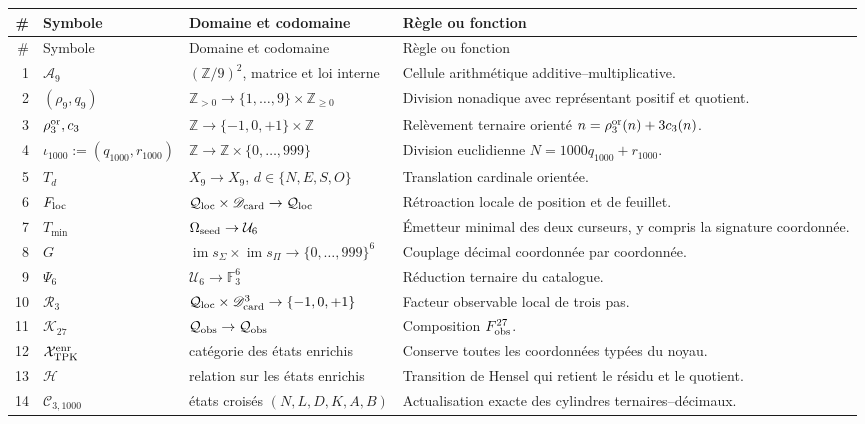 {\begingroup
\scriptsize
\renewcommand{\arraystretch}{1.12}
\begin{longtable}{@{}r p{}p{}p{}@{}}
\toprule
\#&Symbole&Domaine et codomaine&Règle ou fonction\\
\midrule
\endfirsthead
\toprule
\#&Symbole&Domaine et codomaine&Règle ou fonction\\
\midrule
\endhead
1&\(\mathcal A_9\)&\((\mathbb Z/9)^2\), matrice et loi interne&
Cellule arithmétique additive--multiplicative.\\
2&\((\rho_9,q_9)\)&\(\mathbb Z_{>0}\to
\{1,\ldots,9\}\times\mathbb Z_{\geq0}\)&
Division nonadique avec représentant positif et quotient.\\
3&\(\rho_3^{\rm or},c_3\)&\(\mathbb Z\to
\{-1,0,+1\}\times\mathbb Z\)&
Relèvement ternaire orienté \(n=\rho_3^{\rm or}(n)+3c_3(n)\).\\
4&\(\iota_{1000}:=(q_{1000},r_{1000})\)&\(\mathbb Z\to
\mathbb Z\times\{0,\ldots,999\}\)&
Division euclidienne \(N=1000q_{1000}+r_{1000}\).\\
5&\(T_d\)&\(X_9\to X_9\), \(d\in\{N,E,S,O\}\)&
Translation cardinale orientée.\\
6&\(F_{\rm loc}\)&\(\mathcal Q_{\rm loc}\times
\mathscr D_{\rm card}\to\mathcal Q_{\rm loc}\)&
Rétroaction locale de position et de feuillet.\\
7&\(T_{\min}\)&\(\Omega_{\rm seed}\to\mathcal U_6\)&
Émetteur minimal des deux curseurs, y compris la signature coordonnée.\\
8&\(G\)&\(\operatorname{im}s_\Sigma\times
\operatorname{im}s_\Pi\to\{0,\ldots,999\}^6\)&
Couplage décimal coordonnée par coordonnée.\\
9&\(\Psi_6\)&\(\mathcal U_6\to\mathbb F_3^6\)&
Réduction ternaire du catalogue.\\
10&\(\mathcal R_3\)&\(\mathcal Q_{\rm loc}\times
\mathscr D_{\rm card}^3\to\{-1,0,+1\}\)&
Facteur observable local de trois pas.\\
11&\(\mathcal K_{27}\)&\(\mathcal Q_{\rm obs}\to\mathcal Q_{\rm obs}\)&
Composition \(F_{\rm obs}^{27}\).\\
12&\(\mathcal X_{\rm TPK}^{\rm enr}\)&catégorie des états enrichis&
Conserve toutes les coordonnées typées du noyau.\\
13&\(\mathcal H\)&relation sur les états enrichis&
Transition de Hensel qui retient le résidu et le quotient.\\
14&\(\mathcal C_{3,1000}\)&états croisés
\((N,L,D,K,A,B)\)&
Actualisation exacte des cylindres ternaires--décimaux.\\

\end{longtable}}
